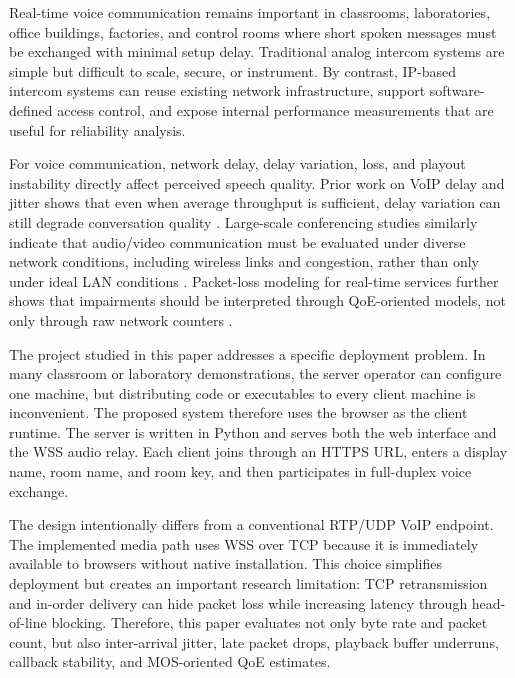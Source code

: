 \documentclass[conference]{IEEEtran}
\begin{document}
Real-time voice communication remains important in classrooms, laboratories, office buildings, factories, and control rooms where short spoken messages must be exchanged with minimal setup delay. Traditional analog intercom systems are simple but difficult to scale, secure, or instrument. By contrast, IP-based intercom systems can reuse existing network infrastructure, support software-defined access control, and expose internal performance measurements that are useful for reliability analysis.

For voice communication, network delay, delay variation, loss, and playout instability directly affect perceived speech quality. Prior work on VoIP delay and jitter shows that even when average throughput is sufficient, delay variation can still degrade conversation quality \cite{ieee_voip_delay_jitter}. Large-scale conferencing studies similarly indicate that audio/video communication must be evaluated under diverse network conditions, including wireless links and congestion, rather than only under ideal LAN conditions \cite{ieee_surecall}. Packet-loss modeling for real-time services further shows that impairments should be interpreted through QoE-oriented models, not only through raw network counters \cite{ieee_packet_loss_qoe}.

The project studied in this paper addresses a specific deployment problem. In many classroom or laboratory demonstrations, the server operator can configure one machine, but distributing code or executables to every client machine is inconvenient. The proposed system therefore uses the browser as the client runtime. The server is written in Python and serves both the web interface and the WSS audio relay. Each client joins through an HTTPS URL, enters a display name, room name, and room key, and then participates in full-duplex voice exchange.

The design intentionally differs from a conventional RTP/UDP VoIP endpoint. The implemented media path uses WSS over TCP because it is immediately available to browsers without native installation. This choice simplifies deployment but creates an important research limitation: TCP retransmission and in-order delivery can hide packet loss while increasing latency through head-of-line blocking. Therefore, this paper evaluates not only byte rate and packet count, but also inter-arrival jitter, late packet drops, playback buffer underruns, callback stability, and MOS-oriented QoE estimates.
\end{document}
